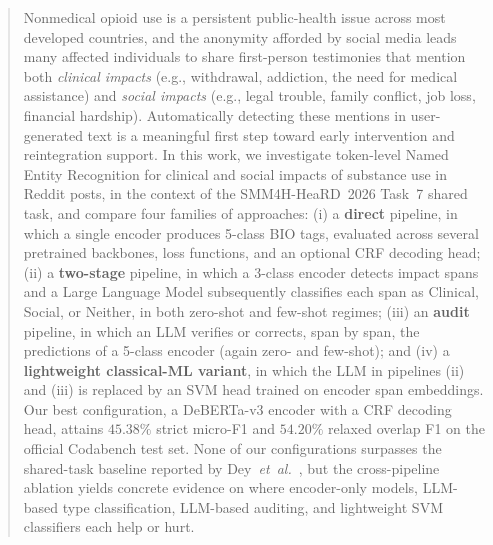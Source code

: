 \documentclass[journal]{IEEEtran}
\begin{document}







\maketitle

\begin{abstract}
Nonmedical opioid use is a persistent public-health issue across most
developed countries, and the anonymity afforded by social media leads many
affected individuals to share first-person testimonies that mention both
\emph{clinical impacts} (e.g., withdrawal, addiction, the need for medical
assistance) and \emph{social impacts} (e.g., legal trouble, family conflict,
job loss, financial hardship). Automatically detecting these mentions in
user-generated text is a meaningful first step toward early intervention and
reintegration support. In this work, we investigate token-level Named Entity
Recognition for clinical and social impacts of substance use in Reddit posts,
in the context of the SMM4H-HeaRD~2026 Task~7 shared task, and compare four
families of approaches: (i) a \textbf{direct} pipeline, in which a single
encoder produces 5-class BIO tags, evaluated across several pretrained
backbones, loss functions, and an optional CRF decoding head;
(ii) a \textbf{two-stage} pipeline, in which a 3-class encoder detects
impact spans and a Large Language Model subsequently classifies each span
as Clinical, Social, or Neither, in both zero-shot and few-shot regimes;
(iii) an \textbf{audit} pipeline, in which an LLM verifies or corrects,
span by span, the predictions of a 5-class encoder (again zero- and
few-shot); and (iv) a \textbf{lightweight classical-ML variant}, in which
the LLM in pipelines (ii) and (iii) is replaced by an SVM head trained on
encoder span embeddings. Our best configuration, a DeBERTa-v3 encoder with
a CRF decoding head, attains $45.38\%$ strict micro-F1 and $54.20\%$ relaxed
overlap F1 on the official Codabench test set. None of our configurations
surpasses the shared-task baseline reported by Dey~\emph{et~al.}~\cite{dey2025inference},
but the cross-pipeline ablation yields concrete evidence on where encoder-only
models, LLM-based type classification, LLM-based auditing, and lightweight
SVM classifiers each help or hurt.
\end{abstract}
\end{document}

